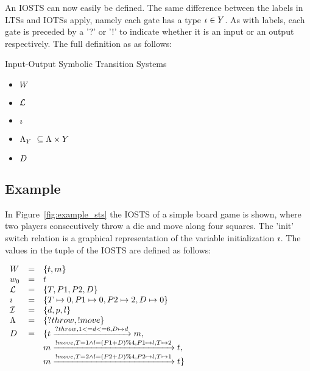 An IOSTS can now easily be defined. The same difference between the labels in LTSs and IOTSs apply, namely each gate has a type $\iota \in Y$. As with labels, each gate is preceded by a '?' or '!' to indicate whether it is an input or an output respectively. The full definition as as follows:
\vspace{5px}
\begin{definition} Input-Output Symbolic Transition Systems
\begin{itemize}
\item $W$
\item $\mathcal{L}$
\item $\imath$
\item {}$\Lambda_{Y}\ \subseteq \Lambda \times Y$
\item $D$
\end{itemize}
\end{definition}

\subsection{Example}\label{sec:sts_example}
In Figure~\ref{fig:example_sts} the IOSTS of a simple board game is shown, where two players consecutively throw a die and move along four squares. The 'init' switch relation is a graphical representation of the variable initialization $\imath$. The values in the tuple of the IOSTS are defined as follows:

$\begin{array}{lcl}
W & = & \{t, m\} \\
w_0 & = & t \\
\mathcal{L} & = & \{T, P1, P2, D\} \\
\imath & = & \{T \mapsto 0, P1 \mapsto 0, P2 \mapsto 2, D \mapsto 0\} \\
\mathcal{I} & = & \{d, p, l\} \\
\Lambda & = & \{?throw, !move\} \\
D & = & \{t\xrightarrow{?throw, 1 <= d <= 6, D \mapsto d}m, \\
 & & m\xrightarrow{!move, T=1 \land l=(P1+D)\%4, P1 \mapsto l, T \mapsto 2}t, \\
 & & m\xrightarrow{!move, T=2 \land l=(P2+D)\%4, P2 \mapsto l, T \mapsto 1}t\}
\end{array}$

